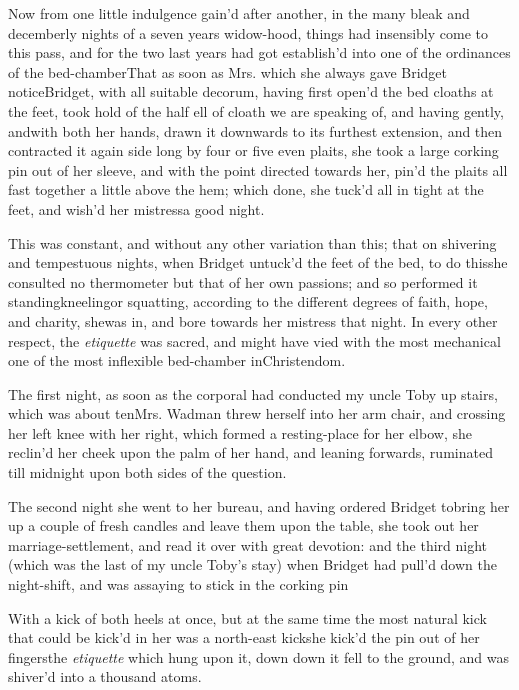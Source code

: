 \documentclass{article}
\begin{document}
Now from one little indulgence gain’d after another, in the many
bleak and decemberly nights of a seven years widow-hood, things
had insensibly come to this pass, and for the two last years had
got establish’d into one of the ordinances of the
bed-chamber\tsk That as soon as Mrs.\@ 
{}
which she always gave Bridget notice\tsk Bridget, with all
suitable decorum, having first open’d the bed cloaths at the
feet, took hold of the half ell of cloath we are speaking of,
and having gently, and\pb with both her hands, drawn it
downwards to its furthest extension, and then contracted it
again side long by four or five even plaits, she took a large
corking pin out of her sleeve, and with the point directed
towards her, pin’d the plaits all fast together a little above
the hem; which done, she tuck’d all in tight at the feet, and
wish’d her mistress\break a good night.

This was constant, and without any other variation than this;
that on shivering and tempestuous nights, when Bridget
untuck’d the feet of the bed, \etc to do
this\tsk she consulted no thermometer but that of her own
passions; and so performed it standing\tsk kneeling\break\tsk or
squatting, according to the different degrees of faith, hope, and
charity, she\pb was in, and bore towards her mistress that night. In
every other respect, the \textit{etiquette} was sacred, and might
have vied with the most mechanical one of the most inflexible
bed-chamber in\break Christendom.

The first night, as soon as the corporal had conducted my uncle
Toby up stairs, which was about ten\tsh Mrs.\break
Wadman threw herself into her arm chair, and crossing her
left knee with her right, which formed a resting-place for her
elbow, she reclin’d her cheek upon the palm of her hand, and
leaning forwards, ruminated till midnight upon both sides of
the question.

The second night she went to her bureau, and having ordered
Bridget to\pb bring her up a couple of fresh candles and leave
them upon the table, she took out her marriage-settlement, and read
it over with great devotion: and the third night (which was the
last of my uncle Toby’s stay) when Bridget had
pull’d down the night-shift, and was assaying to stick in the
corking pin\tsh

\tsh With a kick of both heels at once, but at the same
time the most natural kick that could be kick’d in her
was a north-east kick\tsh she kick’d the pin out of her
fingers\tsh the \textit{etiquette} which hung upon it, down\tsh
down it fell to the ground, and was shiver’d into a thousand
atoms.
\end{document}
